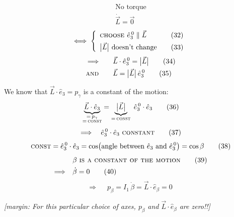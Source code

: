 \documentclass[11pt]{article}
\newcommand{\ehat}[1]{\hat{e}_{#1}}
\newcommand{\ezero}[1]{\hat{e}^{\,0}_{#1}}
\begin{document}
\begin{gather*}
\text{No torque} \tag{30}\label{eq:B30}\\
\dot{\vec{L}} = \vec{0} \tag{31}\label{eq:B31}
\end{gather*}
\begin{equation*}
\Longleftrightarrow\;
\left\{
\begin{array}{l@{\qquad}l}
\textsc{choose } \ezero{3} \parallel \vec{L} & (32)\\[4pt]
\bigl|\vec{L}\bigr| \text{ doesn't change} & (33)
\end{array}\right.
\end{equation*}
\begin{align*}
\Longrightarrow\qquad &\vec{L}\cdot\ezero{3} = \bigl|\vec{L}\bigr|
\tag{34}\label{eq:B34}\\
\text{\textsc{and}}\qquad &\vec{L} = \bigl|\vec{L}\bigr|\,\ezero{3}
\tag{35}\label{eq:B35}
\end{align*}

We know that $\vec{L}\cdot\ehat{3} = p_\gamma$ is a constant of the motion:
\begin{equation*}
\underbrace{\vec{L}\cdot\ehat{3}}_{\substack{=\,p_\gamma\\ =\,\textsc{const}}}
= \underbrace{\bigl|\vec{L}\bigr|}_{=\,\textsc{const}}\;\ezero{3}\cdot\ehat{3}
\tag{36}\label{eq:B36}
\end{equation*}
\begin{equation*}
\Longrightarrow\quad \ezero{3}\cdot\ehat{3}\ \textsc{constant}
\tag{37}\label{eq:B37}
\end{equation*}
\begin{equation*}
\textsc{const} = \ezero{3}\cdot\ehat{3}
= \cos\bigl(\text{angle between } \ehat{3} \text{ and } \ezero{3}\bigr) = \cos\beta
\tag{38}\label{eq:B38}
\end{equation*}
\begin{align*}
&\beta \ \textsc{is a constant of the motion}
\tag{39}\label{eq:B39}\\
\Longrightarrow\quad &\dot{\beta} = 0
\tag{40}\label{eq:B40}
\end{align*}
\begin{equation*}
\Longrightarrow\quad
\boxed{\;p_\beta = I_1\,\dot{\beta} = \vec{L}\cdot\ehat{\beta} = 0\;}
\tag{41}\label{eq:B41}
\end{equation*}

\hfill\textit{[margin: For this particular choice of axes, $p_\beta$ and $\vec{L}\cdot\ehat{\beta}$
are zero!!]}
\end{document}

